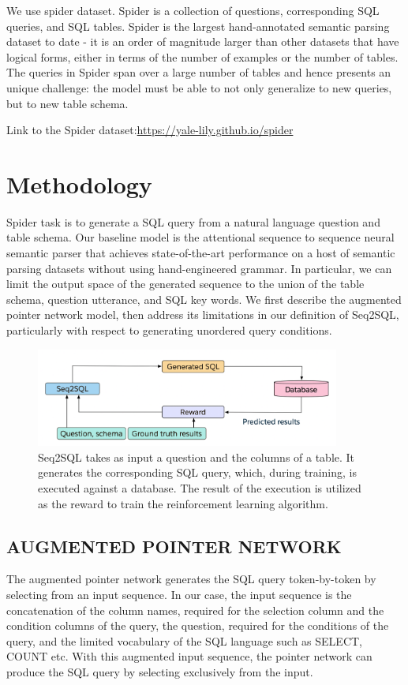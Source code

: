\documentclass{article}
\begin{document}
We use spider dataset. Spider is a collection of questions, corresponding SQL queries, and SQL tables. Spider is the largest hand-annotated semantic parsing dataset to date - it is an order of magnitude larger than other datasets that have logical forms, either in terms of the number of examples or the number of tables. The queries in Spider span over a large number of tables and hence presents an unique challenge: the model must be able to not only generalize to new queries, but to new table schema.

Link to the Spider dataset:\url{https://yale-lily.github.io/spider}

\section{Methodology}

Spider task is to generate a SQL query from a natural language question and table schema.
Our baseline model is the attentional sequence to sequence neural semantic parser that achieves state-of-the-art performance on a host of semantic parsing datasets
without using hand-engineered grammar. In particular, we can limit the output space of the generated
sequence to the union of the table schema, question utterance, and SQL key words. We first describe
the augmented pointer network model, then address its limitations in our definition of Seq2SQL,
particularly with respect to generating unordered query conditions.
\clearpage

\begin{figure}[htp]
    \centering
    \includegraphics[width=10cm]{Seq2SQL Fig 1}
    \caption{ Seq2SQL takes as input a question and the columns of a table. It generates the corresponding SQL query, which, during training, is executed against a database. The result of the
execution is utilized as the reward to train the reinforcement learning algorithm.}
    \label{fig:galaxy}
\end{figure}

\subsection{AUGMENTED POINTER NETWORK}
The augmented pointer network generates the SQL query token-by-token by selecting from an input
sequence. In our case, the input sequence is the concatenation of the column names, required for the
selection column and the condition columns of the query, the question, required for the conditions
of the query, and the limited vocabulary of the SQL language such as SELECT, COUNT etc. With this augmented input sequence, the pointer network
can produce the SQL query by selecting exclusively from the input.
\end{document}
